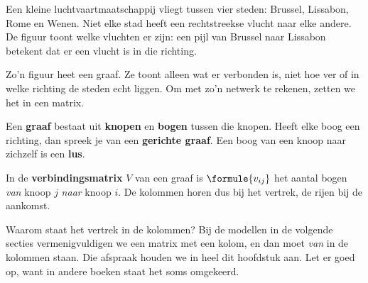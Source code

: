 Een kleine luchtvaartmaatschappij vliegt tussen vier steden: Brussel, Lissabon, Rome en Wenen. Niet elke stad heeft een rechtstreekse vlucht naar elke andere. De figuur toont welke vluchten er zijn: een pijl van Brussel naar Lissabon betekent dat er een vlucht is in die richting.

Zo'n figuur heet een graaf. Ze toont alleen wat er verbonden is, niet hoe ver of in welke richting de steden echt liggen. Om met zo'n netwerk te rekenen, zetten we het in een matrix.

\begin{theorie}
Een \textbf{\textcolor{accent}{graaf}} bestaat uit \textbf{\textcolor{accent}{knopen}} en \textbf{\textcolor{accent}{bogen}} tussen die knopen. Heeft elke boog een richting, dan spreek je van een \textbf{\textcolor{accent}{gerichte graaf}}. Een boog van een knoop naar zichzelf is een \textbf{\textcolor{accent}{lus}}.

\vspace{1mm}
In de \textbf{\textcolor{accent}{verbindingsmatrix}} $V$ van een graaf is $\formule{v_{ij}}$ het aantal bogen \emph{van} knoop $j$ \emph{naar} knoop $i$. De kolommen horen dus bij het vertrek, de rijen bij de aankomst.
\end{theorie}

Waarom staat het vertrek in de kolommen? Bij de modellen in de volgende secties vermenigvuldigen we een matrix met een kolom, en dan moet \textit{van} in de kolommen staan. Die afspraak houden we in heel dit hoofdstuk aan. Let er goed op, want in andere boeken staat het soms omgekeerd.


